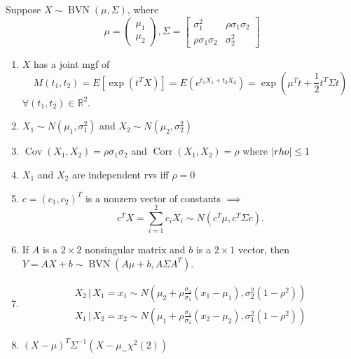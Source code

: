 \documentclass[notoc,notitlepage]{tufte-book}
\DeclareMathOperator{\BVN}{BVN }
\DeclareMathOperator{\Cov}{Cov }
\DeclareMathOperator{\Corr}{Corr }
\begin{document}
\begin{propo}
\label{propo:properties_of_bivariate_normal_distribution}
  Suppose $X \sim \BVN(\mu, \Sigma)$, where
  \begin{equation*}
    \mu = \begin{pmatrix}
      \mu_1 \\ \mu_2
    \end{pmatrix},
    \Sigma = \begin{bmatrix}
      \sigma_1^2 & \rho \sigma_1 \sigma_2 \\
      \rho \sigma_1 \sigma_2 & \sigma_2^2
    \end{bmatrix}
  \end{equation*}
  \begin{enumerate}
    \item $X$ has a joint mgf of
      \begin{equation*}
        M(t_1, t_2) = E[ \exp\left( t^T X \right) ] = E\left( e^{t_1 X_1 + t_2 X_2} \right) = \exp\left( \mu^T t + \frac{1}{2} t^T \Sigma t \right)
      \end{equation*}
      $\forall (t_1, t_2) \in \mathbb{R}^2$.

    \item $X_1 \sim N(\mu_1, \sigma_1^2)$ and $X_2 \sim N(\mu_2, \sigma_2^2)$
    \item $\Cov(X_1, X_2) = \rho \sigma_1 \sigma_2$ and $\Corr(X_1, X_2) = \rho$ where $\left|rho\right| \leq 1$
    \item $X_1$ and $X_2$ are independent rvs iff $\rho = 0$
    \item $c = (c_1, c_2)^T$ is a nonzero vector of constants $\implies$
      \begin{equation*}
        c^T X = \sum_{i=1}^{2} c_i X_i \sim N \left( c^T \mu, c^T \Sigma c \right).
      \end{equation*}
    \item If $A$ is a $2 \times 2$ nonsingular matrix and $b$ is a $2 \times 1$ vector, then $Y = AX + b \sim \BVN\left( A\mu + b, A \Sigma A^T \right)$.
    \item
      \begin{gather*}
        X_2 \, | \, X_1 = x_1 \sim N \left( \mu_2 + \rho \frac{\sigma_2}{\sigma_1}( x_1 - \mu_1 ), \sigma_2^2 (1 - \rho^2) \right) \\
        X_1 \, | \, X_2 = x_2 \sim N \left( \mu_1 + \rho \frac{\sigma_1}{\sigma_2}( x_2 - \mu_2 ), \sigma_1^2 (1 - \rho^2) \right)
      \end{gather*}

    \item $(X - \mu)^T \Sigma^{-1} (X - \mu_ \sim \chi^2 (2))$
  \end{enumerate}
\end{propo}
\end{document}
